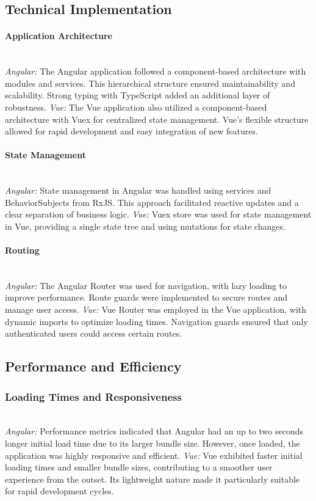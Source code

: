 \documentclass[conference]{IEEEtran}
\begin{document}
\subsection{Technical Implementation}
\paragraph{Application Architecture}
\textit{\\Angular: }The Angular application followed a component-based architecture with modules and services. This hierarchical structure ensured maintainability and scalability. Strong typing with TypeScript added an additional layer of robustness.
\newline\textit{Vue: }The Vue application also utilized a component-based architecture with Vuex for centralized state management. Vue's flexible structure allowed for rapid development and easy integration of new features.
\paragraph{State Management}
\textit{\\Angular: }State management in Angular was handled using services and BehaviorSubjects from RxJS. This approach facilitated reactive updates and a clear separation of business logic.
\newline\textit{Vue: }Vuex store was used for state management in Vue, providing a single state tree and using mutations for state changes.
\paragraph{Routing}
\textit{\\Angular: }The Angular Router was used for navigation, with lazy loading to improve performance. Route guards were implemented to secure routes and manage user access.
\newline\textit{Vue: }Vue Router was employed in the Vue application, with dynamic imports to optimize loading times. Navigation guards ensured that only authenticated users could access certain routes.

\subsection{Performance and Efficiency}
\subsubsection{Loading Times and Responsiveness}
\textit{\\Angular: }Performance metrics indicated that Angular had an up to two seconds longer initial load time due to its larger bundle size. However, once loaded, the application was highly responsive and efficient.
\newline\textit{Vue: }Vue exhibited faster initial loading times and smaller bundle sizes, contributing to a smoother user experience from the outset. Its lightweight nature made it particularly suitable for rapid development cycles.
\end{document}
